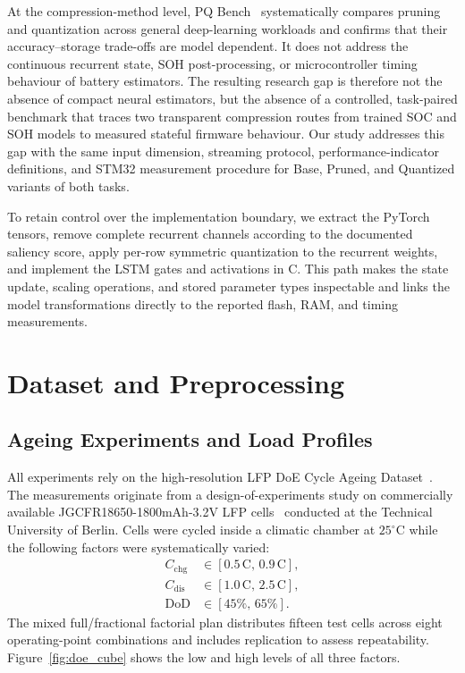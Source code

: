 \documentclass[review]{elsarticle}
\begin{document}
At the compression-method level, PQ Bench~\cite{schulzePQBenchBenchmarking2025} systematically compares pruning and quantization across general deep-learning workloads and confirms that their accuracy--storage trade-offs are model dependent. It does not address the continuous recurrent state, SOH post-processing, or microcontroller timing behaviour of battery estimators. The resulting research gap is therefore not the absence of compact neural estimators, but the absence of a controlled, task-paired benchmark that traces two transparent compression routes from trained SOC and SOH models to measured stateful firmware behaviour. Our study addresses this gap with the same input dimension, streaming protocol, performance-indicator definitions, and STM32 measurement procedure for Base, Pruned, and Quantized variants of both tasks.

To retain control over the implementation boundary, we extract the PyTorch tensors, remove complete recurrent channels according to the documented saliency score, apply per-row symmetric quantization to the recurrent weights, and implement the LSTM gates and activations in C. This path makes the state update, scaling operations, and stored parameter types inspectable and links the model transformations directly to the reported flash, RAM, and timing measurements.
\section{Dataset and Preprocessing}
\subsection{Ageing Experiments and Load Profiles}
All experiments rely on the high-resolution LFP DoE Cycle Ageing Dataset~\cite{LFP_DoE_Cycle_Aging_Dataset}. The measurements originate from a design-of-experiments study on commercially available JGCFR18650-1800mAh-3.2V LFP cells~\cite{jgneJGCFR186501800mAh32VProductSpecification} conducted at the Technical University of Berlin. Cells were cycled inside a climatic chamber at $25^\circ\mathrm{C}$ while the following factors were systematically varied:
\begin{align}
    C_{\mathrm{chg}} &\in [0.5\,\mathrm{C},\,0.9\,\mathrm{C}],\\
    C_{\mathrm{dis}} &\in [1.0\,\mathrm{C},\,2.5\,\mathrm{C}],\\
    \mathrm{DoD} &\in [45\%,\,65\%].
\end{align}
The mixed full/fractional factorial plan distributes fifteen test cells across eight operating-point combinations and includes replication to assess repeatability. Figure~\ref{fig:doe_cube} shows the low and high levels of all three factors.
\end{document}

